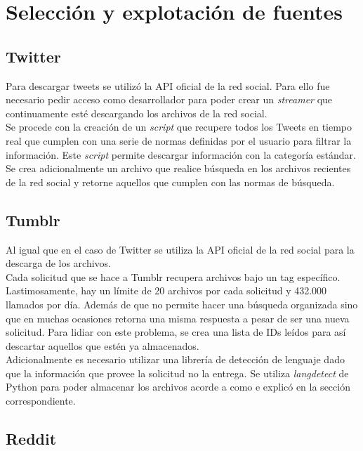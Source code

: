 \section{Selección y explotación de fuentes}

\subsection{Twitter}
Para descargar tweets se utilizó la API oficial de la red social. Para ello fue necesario pedir acceso como desarrollador para poder crear un \textit{streamer} que continuamente esté descargando los archivos de la red social.\\ 

Se procede con la creación de un \textit{script} que recupere todos los Tweets en tiempo real que cumplen con una serie de normas definidas por el usuario para filtrar la información. Este \textit{script} permite descargar información con la categoría estándar. Se crea adicionalmente un archivo que realice búsqueda en los archivos recientes de la red social y retorne aquellos que cumplen con las normas de búsqueda.

\subsection{Tumblr}
Al igual que en el caso de Twitter se utiliza la API oficial de la red social para la descarga de los archivos.\\

Cada solicitud que se hace a Tumblr recupera archivos bajo un tag específico. Lastimosamente, hay un límite de 20 archivos por cada solicitud y 432.000 llamados por día. Además de que no permite hacer una búsqueda organizada sino que en muchas ocasiones retorna una misma respuesta a pesar de ser una nueva solicitud. Para lidiar con este problema, se crea una lista de IDs leídos para así descartar aquellos que estén ya almacenados.\\ 

Adicionalmente es necesario utilizar una librería de detección de lenguaje dado que la información que provee la solicitud no la entrega. Se utiliza \textit{langdetect} de Python para poder almacenar los archivos acorde a como e explicó en la sección correspondiente.

\subsection{Reddit}

